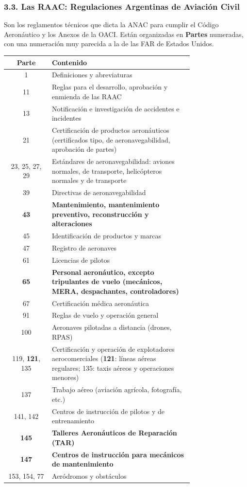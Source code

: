 \subsubsection*{3.3. Las RAAC: Regulaciones Argentinas de Aviación Civil}
Son los reglamentos técnicos que dicta la ANAC para cumplir el Código Aeronáutico y los Anexos
de la OACI. Están organizadas en \textbf{Partes} numeradas, con una numeración muy parecida a la
de las FAR de Estados Unidos.

\begin{center}
\small
\begin{tabular}{|c|p{0.76\linewidth}|}
\hline
\textbf{Parte} & \textbf{Contenido} \\ \hline
1 & Definiciones y abreviaturas \\ \hline
11 & Reglas para el desarrollo, aprobación y enmienda de las RAAC \\ \hline
13 & Notificación e investigación de accidentes e incidentes \\ \hline
21 & Certificación de productos aeronáuticos (certificados tipo, de aeronavegabilidad,
aprobación de partes) \\ \hline
23, 25, 27, 29 & Estándares de aeronavegabilidad: aviones normales, de transporte, helicópteros
normales y de transporte \\ \hline
39 & Directivas de aeronavegabilidad \\ \hline
\textbf{43} & \textbf{Mantenimiento, mantenimiento preventivo, reconstrucción y alteraciones} \\
\hline
45 & Identificación de productos y marcas \\ \hline
47 & Registro de aeronaves \\ \hline
61 & Licencias de pilotos \\ \hline
\textbf{65} & \textbf{Personal aeronáutico, excepto tripulantes de vuelo (mecánicos, MERA,
despachantes, controladores)} \\ \hline
67 & Certificación médica aeronáutica \\ \hline
91 & Reglas de vuelo y operación general \\ \hline
100 & Aeronaves pilotadas a distancia (drones, RPAS) \\ \hline
119, \textbf{121}, 135 & Certificación y operación de explotadores aerocomerciales (\textbf{121}:
líneas aéreas regulares; 135: taxis aéreos y operaciones menores) \\ \hline
137 & Trabajo aéreo (aviación agrícola, fotografía, etc.) \\ \hline
141, 142 & Centros de instrucción de pilotos y de entrenamiento \\ \hline
\textbf{145} & \textbf{Talleres Aeronáuticos de Reparación (TAR)} \\ \hline
\textbf{147} & \textbf{Centros de instrucción para mecánicos de mantenimiento} \\ \hline
153, 154, 77 & Aeródromos y obstáculos \\ \hline
\end{tabular}
\end{center}

